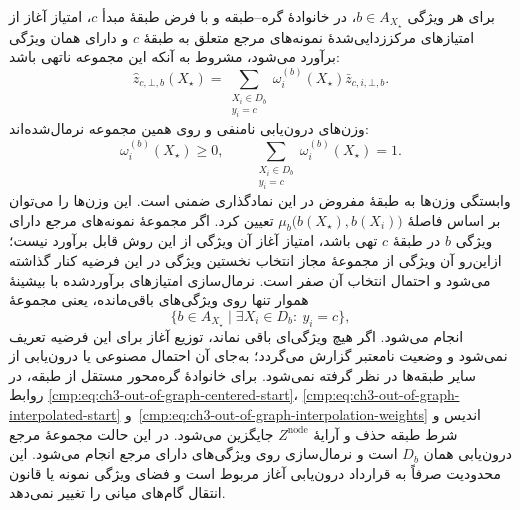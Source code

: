 برای هر ویژگی $b\in A_{X_\star}$، در خانوادهٔ گره--طبقه
و با فرض طبقهٔ مبدأ $c$، امتیاز آغاز از امتیازهای
مرکززدایی‌شدهٔ نمونه‌های مرجع متعلق به طبقهٔ $c$
و دارای همان ویژگی برآورد می‌شود، مشروط به آنکه
این مجموعه ناتهی باشد:
\begin{equation}\label{cmp:eq:ch3-out-of-graph-interpolated-start}
\boxed{
\widehat z_{c,\bot,b}(X_\star)
=
\sum_{\substack{X_i\in D_b\\y_i=c}}
\omega_i^{(b)}(X_\star)
\bar z_{c,i,\bot,b}.
}
\end{equation}
وزن‌های درون‌یابی نامنفی و روی همین مجموعه نرمال‌شده‌اند:
\begin{equation}\label{cmp:eq:ch3-out-of-graph-interpolation-weights}
\omega_i^{(b)}(X_\star)\ge0,
\qquad
\sum_{\substack{X_i\in D_b\\y_i=c}}
\omega_i^{(b)}(X_\star)=1.
\end{equation}
وابستگی وزن‌ها به طبقهٔ مفروض در این نمادگذاری
ضمنی است. این وزن‌ها را می‌توان بر اساس فاصلهٔ
$\mu_b\bigl(b(X_\star),b(X_i)\bigr)$ تعیین کرد.
اگر مجموعهٔ نمونه‌های مرجع دارای ویژگی $b$
در طبقهٔ $c$ تهی باشد، امتیاز آغاز آن ویژگی
از این روش قابل برآورد نیست؛ ازاین‌رو
آن ویژگی از مجموعهٔ مجاز انتخاب نخستین ویژگی
در این فرضیه کنار گذاشته می‌شود و احتمال انتخاب آن
صفر است. نرمال‌سازی امتیازهای برآوردشده با
بیشینهٔ هموار تنها روی ویژگی‌های باقی‌مانده،
یعنی مجموعهٔ
\[
\bigl\{b\in A_{X_\star}\mid
\exists X_i\in D_b:\ y_i=c\bigr\},
\]
انجام می‌شود. اگر هیچ ویژگی‌ای باقی نماند،
توزیع آغاز برای این فرضیه تعریف نمی‌شود و وضعیت
نامعتبر گزارش می‌گردد؛ به‌جای آن احتمال مصنوعی
یا درون‌یابی از سایر طبقه‌ها در نظر گرفته نمی‌شود.
برای خانوادهٔ گره‌محور مستقل از طبقه، در روابط
\eqref{cmp:eq:ch3-out-of-graph-centered-start}،
\eqref{cmp:eq:ch3-out-of-graph-interpolated-start}
و~\eqref{cmp:eq:ch3-out-of-graph-interpolation-weights}
اندیس و شرط طبقه حذف و آرایهٔ
$Z^{\mathrm{node}}$ جایگزین می‌شود.
در این حالت مجموعهٔ مرجع درون‌یابی همان $D_b$
است و نرمال‌سازی روی ویژگی‌های دارای مرجع انجام
می‌شود. این محدودیت صرفاً به قرارداد درون‌یابی
آغاز مربوط است و فضای ویژگی نمونه یا قانون
انتقال گام‌های میانی را تغییر نمی‌دهد.

